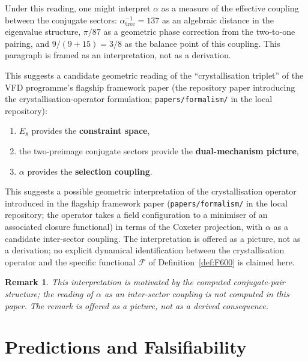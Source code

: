 \documentclass[12pt]{article}
\newtheorem{remark}[theorem]{Remark}
\newcommand{\Fcal}{\mathcal{F}}
\begin{document}
Under this reading, one might interpret $\alpha$ as a measure of the effective coupling between the conjugate sectors: $\alpha^{-1}_{\mathrm{tree}} = 137$ as an algebraic distance in the eigenvalue structure, $\pi/87$ as a geometric phase correction from the two-to-one pairing, and $9/(9 + 15) = 3/8$ as the balance point of this coupling. This paragraph is framed as an interpretation, not as a derivation.

This suggests a candidate geometric reading of the ``crystallisation triplet'' of the VFD programme's flagship framework paper (the repository paper introducing the crystallisation-operator formulation; \texttt{papers/formalism/} in the local repository):
\begin{enumerate}
    \item $E_8$ provides the \textbf{constraint space},
    \item the two-preimage conjugate sectors provide the \textbf{dual-mechanism picture},
    \item $\alpha$ provides the \textbf{selection coupling}.
\end{enumerate}
This suggests a possible geometric interpretation of the crystallisation operator introduced in the flagship framework paper (\texttt{papers/formalism/} in the local repository; the operator takes a field configuration to a minimiser of an associated closure functional) in terms of the Coxeter projection, with $\alpha$ as a candidate inter-sector coupling. The interpretation is offered as a picture, not as a derivation; no explicit dynamical identification between the crystallisation operator and the specific functional $\Fcal$ of Definition~\ref{def:F600} is claimed here.

\begin{remark}
This interpretation is motivated by the computed conjugate-pair structure; the reading of $\alpha$ as an inter-sector coupling is not computed in this paper. The remark is offered as a picture, not as a derived consequence.
\end{remark}

\section{Predictions and Falsifiability}\label{sec:predictions}
\end{document}
